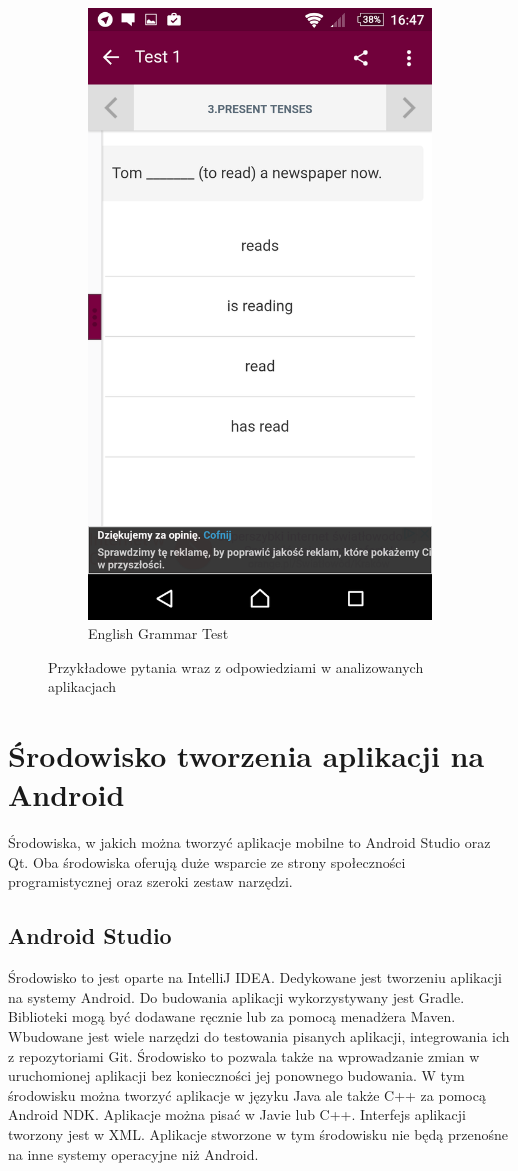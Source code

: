 \documentclass[eng]{mgr}
\begin{document}
\begin{figure}[ht]
\begin{subfigure}{.3\textwidth}
				\includegraphics[width=.7\linewidth]{English_Grammar_Test.png}
				\caption{English Grammar Test}
				\label{fig:english_grammar_test}
			\end{subfigure}
			\caption{Przykładowe pytania wraz z odpowiedziami w analizowanych aplikacjach}
			\label{fig:przykladowe_aplikacje}
		\end{figure}
	
		\section{Środowisko tworzenia aplikacji na Android}
		Środowiska, w jakich można tworzyć aplikacje mobilne to Android Studio oraz Qt. Oba środowiska oferują duże wsparcie ze strony społeczności programistycznej oraz szeroki zestaw narzędzi.
		
			\subsection{Android Studio}
			Środowisko to jest oparte na IntelliJ IDEA. Dedykowane jest tworzeniu aplikacji na systemy Android. Do budowania aplikacji wykorzystywany jest Gradle. Biblioteki mogą być dodawane ręcznie lub za pomocą menadżera Maven. Wbudowane jest wiele narzędzi do testowania pisanych aplikacji, integrowania ich z repozytoriami Git. Środowisko to pozwala także na wprowadzanie zmian w uruchomionej aplikacji bez konieczności jej ponownego budowania. W tym środowisku można tworzyć aplikacje w języku Java ale także C++ za pomocą Android NDK. Aplikacje można pisać w Javie lub C++. Interfejs aplikacji tworzony jest w XML. Aplikacje stworzone w tym środowisku nie będą przenośne na inne systemy operacyjne niż Android.
			
\end{document}
